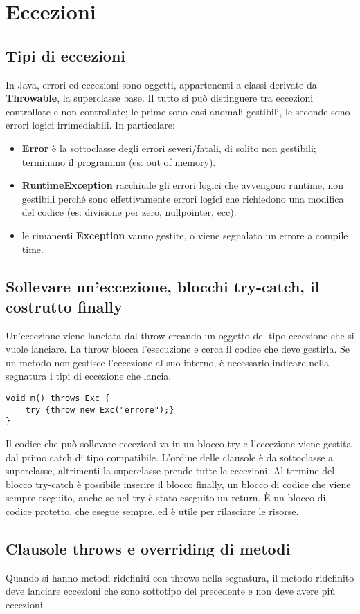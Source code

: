 \chapter{Eccezioni}

\section{Tipi di eccezioni}
In Java, errori ed eccezioni sono oggetti, appartenenti a classi derivate da \textbf{Throwable}, la superclasse base. Il tutto si può distinguere tra eccezioni controllate e non controllate; le prime sono casi anomali gestibili, le seconde sono errori logici irrimediabili.
In particolare:
\begin{itemize}
\item \textbf{Error} è la sottoclasse degli errori severi/fatali, di solito non gestibili; terminano il programma (es: out of memory).
\item \textbf{RuntimeException} racchiude gli errori logici che avvengono runtime, non gestibili perché sono effettivamente errori logici che richiedono una modifica del codice (es: divisione per zero, nullpointer, ecc).
\item le rimanenti \textbf{Exception} vanno gestite, o viene segnalato un errore a compile time.
\end{itemize}

\section{Sollevare un'eccezione, blocchi try-catch, il costrutto finally}
Un'eccezione viene lanciata dal throw creando un oggetto del tipo eccezione che si vuole lanciare. La throw blocca l'esecuzione e cerca il codice che deve gestirla.
Se un metodo non gestisce l'eccezione al suo interno, è necessario indicare nella segnatura i tipi di eccezione che lancia.

\begin{framed}
\begin{verbatim}
void m() throws Exc {
    try {throw new Exc("errore");}
}
\end{verbatim}
\end{framed}


Il codice che può sollevare eccezioni va in un blocco try e l'eccezione viene gestita dal primo catch di tipo compatibile. L'ordine delle clausole è da sottoclasse a superclasse, altrimenti la superclasse prende tutte le eccezioni.
Al termine del blocco try-catch è possibile inserire il blocco finally, un blocco di codice che viene sempre eseguito, anche se nel try è stato eseguito un return. È un blocco di codice protetto, che esegue sempre, ed è utile per rilasciare le risorse.

\section{Clausole throws e overriding di metodi}
Quando si hanno metodi ridefiniti con throws nella segnatura, il metodo ridefinito deve lanciare eccezioni che sono sottotipo del precedente e non deve avere più eccezioni. 



